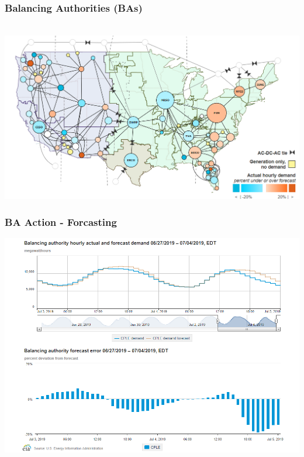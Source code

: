 \documentclass[14pt, unknownkeysallowed]{beamer}
\begin{document}
\begin{frame}
\frametitle{Balancing Authorities (BAs)}\ \vspace{.5em}
{\centering
\href{https://www.eia.gov/realtime_grid/}%
{\includegraphics[width=.95\linewidth]{BAs}} %
}
\end{frame}
\begin{frame}
\frametitle{BA Action - Forcasting} %
\begin{center}
\includegraphics[height=.85\textheight]{BAforcast} %
\end{center}

\end{frame}
\end{document}
